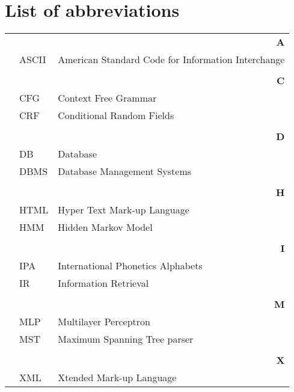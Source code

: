 \chapter*{List of abbreviations}

{\centering
\begin{longtable}{@{}p{2 cm}@{}p{2 cm}@{}p{11 cm}@{}}
\multicolumn{3}{r}{\bf A}\\ \cline{2-3}
&ASCII&American Standard Code for Information Interchange\\
&&\\


\multicolumn{3}{r}{\bf C}\\ \cline{2-3}
&CFG&Context Free Grammar\\
&CRF&Conditional Random Fields\\
&&\\

\multicolumn{3}{r}{\bf D}\\ \cline{2-3}
&DB&Database\\
&DBMS&Database Management Systems\\
&&\\




\multicolumn{3}{r}{\bf H}\\ \cline{2-3}
&HTML &Hyper Text Mark-up Language \\
&HMM&Hidden Markov Model \\
&&\\

\multicolumn{3}{r}{\bf I}\\ \cline{2-3}
&IPA&International Phonetics Alphabets\\
&IR& Information Retrieval\\
&&\\

\multicolumn{3}{r}{\bf M}\\ \cline{2-3}
&MLP&Multilayer Perceptron\\
&MST &Maximum Spanning Tree parser \\
&&\\

\multicolumn{3}{r}{\bf X}\\ \cline{2-3}
&XML&Xtended Mark-up Language\\


\end{longtable}}
